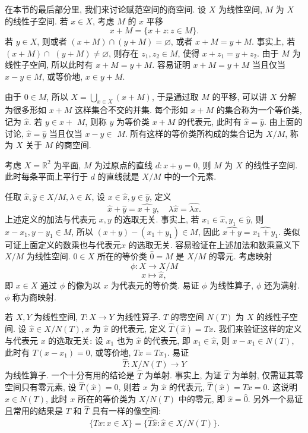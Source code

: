 \documentclass[openany]{ctexbook}
\theoremstyle{kaiti}
\theoremstyle{normal}
\begin{document}
在本节的最后部分里, 我们来讨论赋范空间的商空间. 设 $X$ 为线性空间, $M$ 为 $X$ 的线性子空间. 若 $x \in X$, 考虑 $M$ 的 $x$ 平移
$$
x+M=\{x+z: z \in M\}.
$$
若 $y \in X$, 则或者 $(x+M) \cap(y+M)=\varnothing$, 或者 $x+M=y+M$. 事实上, 若 $(x+M) \cap$ $(y+M) \neq \varnothing$, 则存在 $z_1, z_2 \in M$, 使得 $x+z_1=y+z_2$. 由于 $M$ 为线性子空间, 所以此时有 $x+M=y+M$. 容易证明 $x+M=y+M$ 当且仅当 $x-y \in M$, 或等价地, $x \in y+M$.

由于 $0 \in M$, 所以 $X=\bigcup_{x \in X}(x+M)$, 于是通过取 $M$ 的平移, 可以讲 $X$ 分解为很多形如 $x+M$ 这样集合不交的并集. 每个形如 $x+M$ 的集合称为一个等价类, 记为 $\hat{x}$. 若 $y \in x+$ $M$, 则称 $y$ 为等价类 $x+M$ 的代表元, 此时有 $\hat{x}=\hat{y}$. 由上面的讨论, $\hat{x}=\hat{y}$ 当且仅当 $x-y \in$ $M$. 所有这样的等价类所构成的集合记为 $X / M$, 称为 $X$ 关于 $M$ 的商空间.

考虑 $X=\mathbb{R}^2$ 为平面, $M$ 为过原点的直线 $d: x+y=0$, 则 $M$ 为 $X$ 的线性子空间. 此时每条平面上平行于 $d$ 的直线就是 $X / M$ 中的一个元素.

任取 $\hat{x}, \hat{y} \in X / M, \lambda \in K$, 设 $x \in \hat{x}, y \in \hat{y}$, 定义
$$
\hat{x}+\hat{y}=\widehat{x+y}, \quad \lambda \hat{x}=\widehat{\lambda x}.
$$
上述定义的加法与代表元 $x, y$ 的选取无关. 事实上, 若 $x_1 \in \hat{x}, y_1 \in \hat{y}$, 则 $x-x_1, y-y_1 \in M$, 所以 $(x+y)-\left(x_1+y_1\right) \in M$, 因此 $\widehat{x+y}=\widehat{x_1+y_1}$. 类似可证上面定义的数乘也与代表元$x$ 的选取无关. 容易验证在上述加法和数乘意义下 $X / M$ 为线性空间. $0 \in X$ 所在的等价类 $\hat{0}=M$ 是 $X / M$ 的零元. 考虑映射
$$
\phi: X \rightarrow X / M
$$
$$
x \mapsto \hat{x},
$$
即 $x \in X$ 通过 $\phi$ 的像为以 $x$ 为代表元的等价类. 易证 $\phi$ 为线性算子, $\phi$ 还为满射. $\phi$ 称为商映射.

若 $X, Y$ 为线性空间, $T: X \rightarrow Y$ 为线性算子. $T$ 的零空间 $N(T)$ 为 $X$ 的线性子空间. 设 $\hat{x} \in X / N(T), x$ 为 $\hat{x}$ 的代表元, 定义 $\hat{T}(\hat{x})=T x$. 我们来验证这样的定义与代表元 $x$ 的选取无关: 设 $x_1$ 也为 $\hat{x}$ 的代表元, 即 $x_1 \in \hat{x}$, 则 $x-x_1 \in N(T)$, 此时有 $T\left(x-x_1\right)=0$, 或等价地, $T x=T x_1$. 易证
$$
\hat{T}: X / N(T) \rightarrow Y
$$
为线性算子. 一个十分有用的结论是 $\hat{T}$ 为单射. 事实上, 为证 $\hat{T}$ 为单射, 仅需证其零空间只有零元素, 设 $\hat{T}(\hat{x})=0$, 则若 $x$ 为 $\hat{x}$ 的代表元, $\hat{T}(\hat{x})=T x=0$. 这说明 $x \in N(T)$, 此时 $x$ 所在的等价类为 $X / N(T)$ 中的零元, 即 $\hat{x}=\hat{0}$. 另外一个易证且常用的结果是 $T$ 和 $\hat{T}$ 具有一样的像空间:
$$
\{T x: x \in X\}=\{\hat{T} \hat{x}: \hat{x} \in X / N(T)\}.
$$
\end{document}
